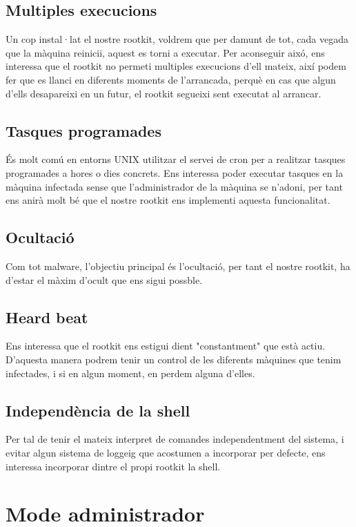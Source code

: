 \subsection{Multiples execucions}
Un cop instal·lat el nostre rootkit, voldrem que per damunt de tot, cada vegada que la màquina reinicii, aquest es torni a executar. 
Per aconseguir aixó, ens interessa que el rootkit no permeti multiples execucions d'ell mateix, així podem fer que es llanci en diferents
moments de l'arrancada, perquè en cas que algun d'ells desapareixi en un futur, el rootkit segueixi sent executat al arrancar.

\subsection{Tasques programades}
És molt comú en entorns UNIX utilitzar el servei de cron per a realitzar tasques programades a hores o dies concrets. Ens interessa
poder executar tasques en la màquina infectada sense que l'administrador de la màquina se n'adoni, per tant ens anirà molt bé que 
el nostre rootkit ens implementi aquesta funcionalitat.

\subsection{Ocultació}
Com tot malware, l'objectiu principal és l'ocultació, per tant el nostre rootkit, ha d'estar el màxim d'ocult que ens sigui possble.

\subsection{Heard beat}
Ens interessa que el rootkit ens estigui dient "constantment" que està actiu. D'aquesta manera podrem tenir un control de les diferents
màquines que tenim infectades, i si en algun moment, en perdem alguna d'elles.

\subsection{Independència de la shell}
Per tal de tenir el mateix interpret de comandes independentment del sistema, i evitar algun sistema de loggeig que acostumen a 
incorporar per defecte, ens interessa incorporar dintre el propi rootkit la shell.

\section{Mode administrador}
